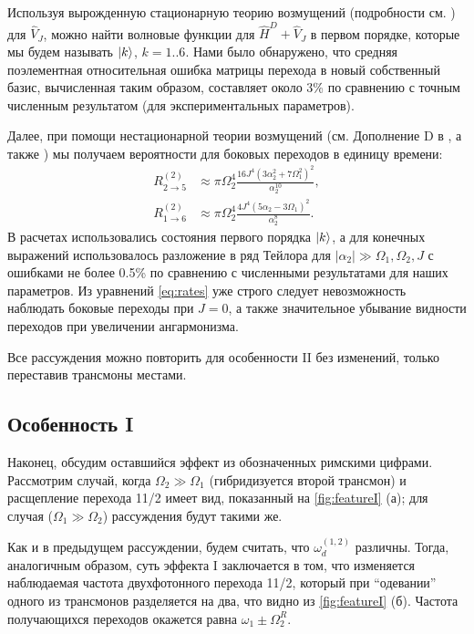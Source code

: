 \documentclass[14pt, a4paper]{extreport}
\DeclarePairedDelimiter\ket{\lvert}{\rangle}
\numberwithin{equation}{section}
\begin{document}
Используя вырожденную стационарную теорию возмущений (подробности см. \cite{landau2013quantum, fedorov2020light}) для $\hat V_J$, можно найти волновые функции для $\hat H^D + \hat V_J$ в первом порядке, которые мы будем называть $\ket{k}$, $k=1..6$. Нами было обнаружено, что средняя поэлементная относительная ошибка матрицы перехода в новый собственный базис, вычисленная таким образом, составляет около 3\% по сравнению с точным численным результатом (для экспериментальных параметров). 

Далее, при помощи нестационарной теории возмущений (см. Дополнение D в \cite{fedorov2020light}, а также \cite{faisal2013theory}) мы получаем вероятности для боковых переходов в единицу времени:
\begin{equation}
\begin{aligned}
R^{(2)}_{2\rightarrow 5} &\approx \pi\Omega_2^4 
\frac{16 J^4 \left(3 \alpha_2^2 + 
	\text{$7\Omega_1^2$}\right)^2}{\alpha_2
	^{10}},\\
R^{(2)}_{1\rightarrow 6} &\approx \pi\Omega_2^4 
\frac{4 J^4 \left(5 \alpha_2 - \text{$3\Omega_1
		$}\right)^2}{\alpha_2^{8}}.
\end{aligned}\label{eq:rates}
\end{equation}
В расчетах использовались состояния первого порядка $ \ket{k} $, а для конечных выражений использовалось разложение в ряд Тейлора для $|\alpha_2|\gg\Omega_1, \Omega_2, J$ с ошибками не более 0.5\% по сравнению с численными результатами для наших параметров. Из уравнений \eqref{eq:rates} уже строго следует невозможность наблюдать боковые переходы при $J=0$, а также значительное убывание видности переходов при увеличении ангармонизма.

Все рассуждения можно повторить для особенности II без изменений, только переставив трансмоны местами.

\subsection{Особенность I}

Наконец, обсудим оставшийся эффект из обозначенных римскими цифрами. Рассмотрим случай, когда $\Omega_2\gg\Omega_1$ (гибридизуется второй трансмон) и расщепление перехода 11/2 имеет вид, показанный на \autoref{fig:featureI} (а); для случая ($\Omega_1 \gg \Omega_2$) рассуждения будут такими же.

Как и в предыдущем рассуждении, будем считать, что $\omega_d^{(1,2)}$ различны. Тогда, аналогичным образом, суть эффекта I заключается в том, что изменяется наблюдаемая частота двухфотонного перехода 11/2, который при ``одевании'' одного из трансмонов разделяется на два, что видно из \autoref{fig:featureI} (б). Частота получающихся переходов окажется равна $\omega_1 \pm \Omega_2^R$.
\end{document}
